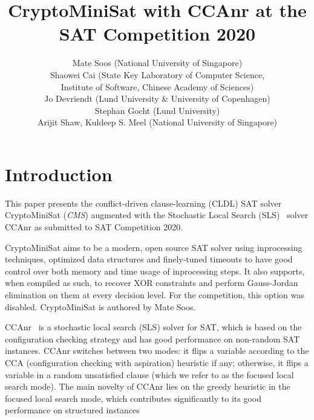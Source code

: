 \documentclass[final]{ieee}
\begin{document}
\title{CryptoMiniSat with CCAnr at the SAT Competition 2020}
\author{Mate Soos (National University of Singapore)\\
Shaowei Cai (State Key Laboratory of Computer Science,\\
Institute of Software, Chinese Academy of Sciences)\\
Jo Devriendt (Lund University \& University of Copenhagen)\\
Stephan Gocht (Lund University)\\
Arijit Shaw, Kuldeep S. Meel (National University of Singapore)}

\maketitle
\thispagestyle{empty}
\pagestyle{empty}

\section{Introduction}
This paper presents the conflict-driven clause-learning (CLDL) SAT solver CryptoMiniSat (\emph{CMS}) augmented with the Stochastic Local Search (SLS)~\cite{DBLP:conf/sat/CaiLS15} solver CCAnr as submitted to SAT Competition 2020.

CryptoMiniSat aims to be a modern, open source SAT solver using inprocessing techniques, optimized data structures and finely-tuned timeouts to have good control over both memory and time usage of inprocessing steps. It also supports, when compiled as such, to recover XOR constraints and perform Gauss-Jordan elimination on them at every decision level. For the competition, this option was disabled. CryptoMiniSat is authored by Mate Soos.

CCAnr~\cite{DBLP:conf/sat/CaiLS15} is a stochastic local search (SLS) solver for SAT, which is based on the configuration checking strategy and has good performance on non-random SAT instances. CCAnr switches between two modes: it flips a variable according to the CCA (configuration checking with aspiration) heuristic if any; otherwise, it flips a variable in a random unsatisfied clause (which we refer to as the focused local search mode). The main novelty of CCAnr lies on the greedy heuristic in the focused local search mode, which contributes significantly to its good performance on structured instances
\end{document}
